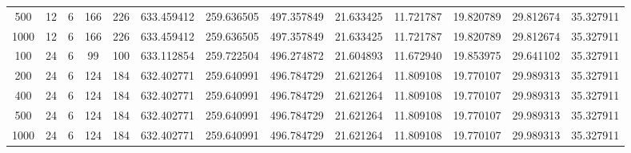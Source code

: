 \begin{table}[h]
\begin{tabular}{ccccccccccccc}
500 & 12 & 6 & 166 & 226 & 633.459412 & 259.636505 & 497.357849 & 21.633425 & 11.721787 & 19.820789 & 29.812674 & 35.327911 \\
1000 & 12 & 6 & 166 & 226 & 633.459412 & 259.636505 & 497.357849 & 21.633425 & 11.721787 & 19.820789 & 29.812674 & 35.327911 \\
100 & 24 & 6 & 99 & 100 & 633.112854 & 259.722504 & 496.274872 & 21.604893 & 11.672940 & 19.853975 & 29.641102 & 35.327911 \\
200 & 24 & 6 & 124 & 184 & 632.402771 & 259.640991 & 496.784729 & 21.621264 & 11.809108 & 19.770107 & 29.989313 & 35.327911 \\
400 & 24 & 6 & 124 & 184 & 632.402771 & 259.640991 & 496.784729 & 21.621264 & 11.809108 & 19.770107 & 29.989313 & 35.327911 \\
500 & 24 & 6 & 124 & 184 & 632.402771 & 259.640991 & 496.784729 & 21.621264 & 11.809108 & 19.770107 & 29.989313 & 35.327911 \\
1000 & 24 & 6 & 124 & 184 & 632.402771 & 259.640991 & 496.784729 & 21.621264 & 11.809108 & 19.770107 & 29.989313 & 35.327911 \\
\bottomrule
\end{tabular}
\end{table}
